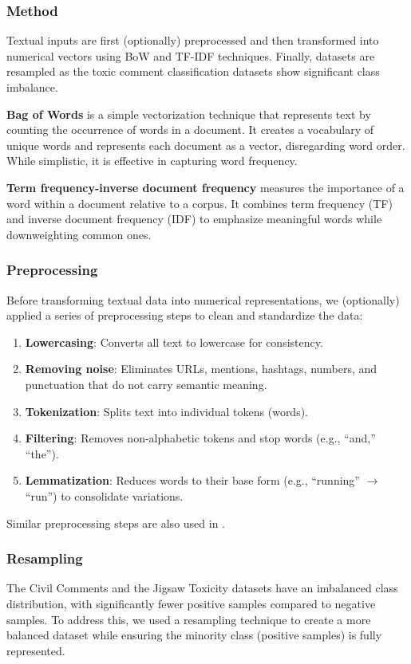 \subsubsection{Method}
Textual inputs are first (optionally) preprocessed and then transformed into numerical vectors using BoW and TF-IDF techniques. Finally, datasets are resampled as the toxic comment classification datasets show significant class imbalance.

\textbf{Bag of Words} is a simple vectorization technique that represents text by counting the occurrence of words in a document. It creates a vocabulary of unique words and represents each document as a vector, disregarding word order. While simplistic, it is effective in capturing word frequency. \cite{Manning2008}

\textbf{Term frequency-inverse document frequency} measures the importance of a word within a document relative to a corpus. It combines term frequency (TF) and inverse document frequency (IDF) to emphasize meaningful words while downweighting common ones. \cite{Manning2008}

\subsubsection{Preprocessing}
Before transforming textual data into numerical representations, we (optionally) applied a series of preprocessing steps to clean and standardize the data:

\begin{enumerate}
    \item \textbf{Lowercasing}: Converts all text to lowercase for consistency.
    \item \textbf{Removing noise}: Eliminates URLs, mentions, hashtags, numbers, and punctuation that do not carry semantic meaning.
    \item \textbf{Tokenization}: Splits text into individual tokens (words).
    \item \textbf{Filtering}: Removes non-alphabetic tokens and stop words (e.g., ``and,'' ``the'').
    \item \textbf{Lemmatization}: Reduces words to their base form (e.g., ``running'' $\rightarrow$ ``run'') to consolidate variations.
\end{enumerate}

Similar preprocessing steps are also used in \cite{Zaheri2020, Husnain2021}.

\subsubsection{Resampling}
The Civil Comments and the Jigsaw Toxicity datasets have an imbalanced class distribution, with significantly fewer positive samples compared to negative samples. To address this, we used a resampling technique to create a more balanced dataset while ensuring the minority class (positive samples) is fully represented.


